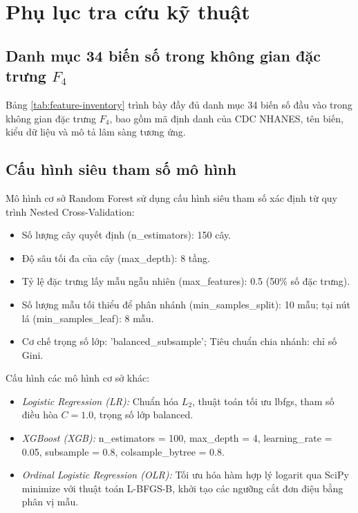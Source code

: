 \chapter{Phụ lục tra cứu kỹ thuật}
\label{ch:phu-luc}

\section{Danh mục 34 biến số trong không gian đặc trưng $F_4$}
\label{sec:app-feature-inventory}

Bảng \ref{tab:feature-inventory} trình bày đầy đủ danh mục 34 biến số đầu vào trong không gian đặc trưng $F_4$, bao gồm mã định danh của CDC NHANES, tên biến, kiểu dữ liệu và mô tả lâm sàng tương ứng.



\section{Cấu hình siêu tham số mô hình}
\label{sec:app-hyperparameters}

Mô hình cơ sở Random Forest sử dụng cấu hình siêu tham số xác định từ quy trình Nested Cross-Validation:
\begin{itemize}
    \item Số lượng cây quyết định (\textnormal{n\_estimators}): 150 cây.
    \item Độ sâu tối đa của cây (\textnormal{max\_depth}): 8 tầng.
    \item Tỷ lệ đặc trưng lấy mẫu ngẫu nhiên (\textnormal{max\_features}): 0.5 (50\% số đặc trưng).
    \item Số lượng mẫu tối thiểu để phân nhánh (\textnormal{min\_samples\_split}): 10 mẫu; tại nút lá (\textnormal{min\_samples\_leaf}): 8 mẫu.
    \item Cơ chế trọng số lớp: \textnormal{'balanced\_subsample'}; Tiêu chuẩn chia nhánh: chỉ số Gini.
\end{itemize}

Cấu hình các mô hình cơ sở khác:
\begin{itemize}
    \item \textit{Logistic Regression (LR):} Chuẩn hóa $L_2$, thuật toán tối ưu lbfgs, tham số điều hòa $C = 1.0$, trọng số lớp balanced.
    \item \textit{XGBoost (XGB):} \textnormal{n\_estimators = 100, max\_depth = 4, learning\_rate = 0.05, subsample = 0.8, colsample\_bytree = 0.8}.
    \item \textit{Ordinal Logistic Regression (OLR):} Tối ưu hóa hàm hợp lý logarit qua SciPy minimize với thuật toán L-BFGS-B, khởi tạo các ngưỡng cắt đơn điệu bằng phân vị mẫu.
\end{itemize}


